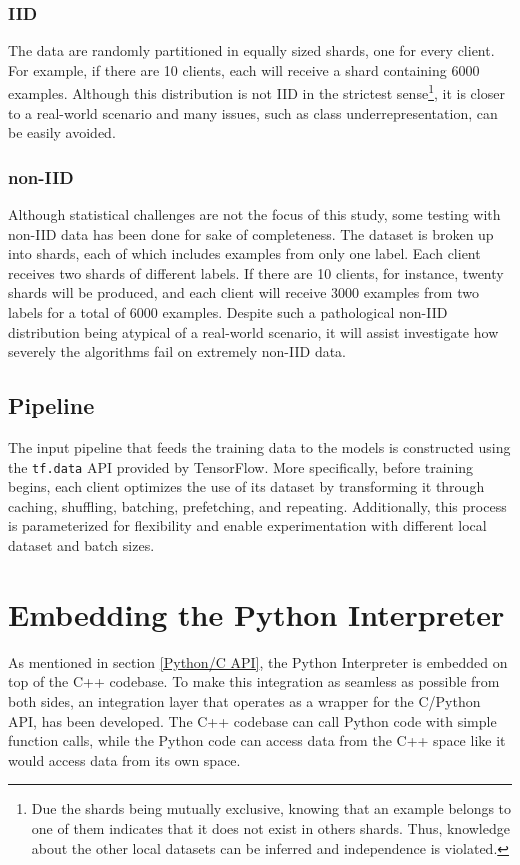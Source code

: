 \subsubsection{IID}
The data are randomly partitioned in equally sized shards, one for every client. For example, if there are 10 clients, each will receive a shard containing 6000 examples. Although this distribution is not IID in the strictest sense\footnote{Due the shards being mutually exclusive, knowing that an example belongs to one of them indicates that it does not exist in others shards. Thus, knowledge about the other local datasets can be inferred and independence is violated.}, it is closer to a real-world scenario and many issues, such as class underrepresentation, can be easily avoided.

\subsubsection{non-IID}
Although statistical challenges are not the focus of this study, some testing with non-IID data has been done for sake of completeness. The dataset is broken up into shards, each of which includes examples from only one label. Each client receives two shards of different labels. If there are 10 clients, for instance, twenty shards will be produced, and each client will receive 3000 examples from two labels for a total of 6000 examples. Despite such a pathological non-IID distribution being atypical of a real-world scenario, it will assist investigate how severely the algorithms fail on extremely non-IID data.

\subsection{Pipeline}
The input pipeline that feeds the training data to the models is constructed using the \texttt{tf.data} API provided by TensorFlow. More specifically, before training begins, each client optimizes the use of its dataset by transforming it through caching, shuffling, batching, prefetching, and repeating. Additionally, this process is parameterized for flexibility and enable experimentation with different local dataset and batch sizes.

\section{Embedding the Python Interpreter}
\label{sec:embedding_python}
As mentioned in section \ref{Python/C API}, the Python Interpreter is embedded on top of the C++ codebase. To make this integration as seamless as possible from both sides, an integration layer that operates as a wrapper for the C/Python API, has been developed. The C++ codebase can call Python code with simple function calls, while the Python code can access data from the C++ space like it would access data from its own space.

